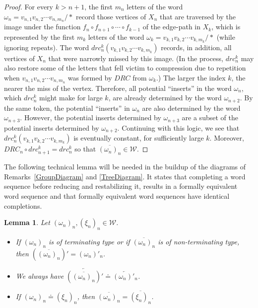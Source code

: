 \documentclass{amsart}
\newtheorem{lemma}[theorem]{Lemma}
\theoremstyle{definition}
\theoremstyle{remark}
\numberwithin{equation}{section}
\begin{document}
\begin{proof} For every $k>n+1$, the first $m_n$ letters of the word $\omega_n=v_{n,1}v_{n,2}\cdots v_{n,{m_n}}/\ast$ record those vertices of $X_n$ that are traversed by the image under the function $f_n\circ f_{n+1}\circ\cdots\circ f_{k-1}$ of the edge-path in $X_k$, which is represented by the first $m_k$ letters of the word $\omega_k=v_{k,1}v_{k,2}\cdots v_{k,{m_k}}/\ast$ (while ignoring repeats). The word
$drc_n^k(v_{k,1}v_{k,2}\cdots v_{k,{m_k}})$ records, in addition, all vertices of $X_n$ that were narrowly missed by this image. (In the process, $drc_n^k$ may also restore some of the letters that fell victim to compression due to repetition when $v_{n,1}v_{n,2}\cdots v_{n,{m_n}}$ was formed by $DRC$ from $\omega_k$.) The larger the index $k$, the nearer the miss of the vertex. Therefore, all potential ``inserts'' in the word $\omega_n$, which  $drc_n^k$ might make for large $k$, are already determined by the word $\omega_{n+2}$. By the same token, the potential ``inserts'' in $\omega_n$ are also determined by the word $\omega_{n+3}$. However, the potential inserts determined by $\omega_{n+3}$ are a subset of the potential inserts determined by $\omega_{n+2}$. Continuing with this logic, we see that $drc_n^k(v_{k,1}v_{k,2}\cdots v_{k,{m_k}})$ is eventually constant, for sufficiently large $k$. Moreover, $DRC_n\circ drc_{n+1}^k=drc_n^k$
so  that $\overline{(\omega_n)_n}\in\mathcal W$.
\end{proof}

The following technical lemma will be needed in the buildup of the diagrams of Remarks~\ref{GroupDiagram} and \ref{TreeDiagram}. It states that completing a word sequence before reducing and restabilizing it, results in a formally equivalent word sequence and that formally equivalent word sequences have identical completions.

\begin{lemma}\label{period} Let $(\omega_n)_n, (\xi_n)_n\in {\mathcal W}$.
\begin{itemize}

\item[(a)] If  $(\omega_n)_n$ is of terminating type or if $\overline{(\omega_n)_n}$ is of non-terminating type, then $\left(\overline{(\omega_n)_n}\right)'=(\omega_n)'_n$.

\item[(b)] We always have $\overleftarrow{\left(\overline{(\omega_n)_n}\right)'}\doteq\overleftarrow{(\omega_n)'_n}$.

\item[(c)] If $(\omega_n)_n \doteq(\xi_n)_n$, then $\overline{(\omega_n)_n}=\overline{(\xi_n)_n}$.

\end{itemize}
\end{lemma}
\end{document}
